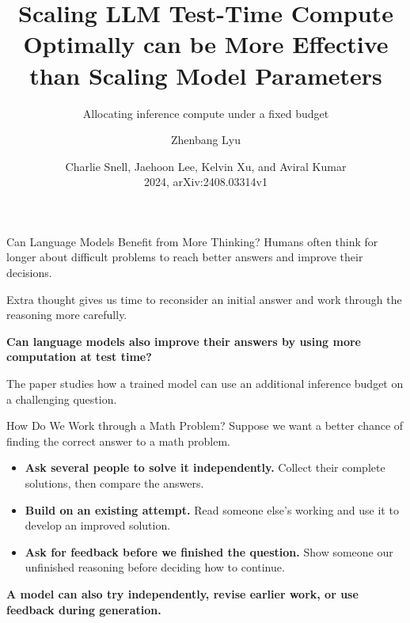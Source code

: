 \documentclass[aspectratio=1610,xcolor=dvipsnames,t]{beamer}
\title[Test-Time Compute in LLMs]{Scaling LLM Test-Time Compute Optimally can be More Effective than Scaling Model Parameters}
\subtitle{Allocating inference compute under a fixed budget}
\author[Zhenbang Lyu]{Zhenbang Lyu}
\institute[Uni HD]{Heidelberg University\\Institute of Computer Science}
\date[]{Charlie Snell, Jaehoon Lee, Kelvin Xu, and Aviral Kumar\\2024, arXiv:2408.03314v1}
\newcommand{\keyterm}[1]{\textcolor{unirot}{\textbf{#1}}}
\begin{document}
\begin{frame}[plain]
  \titlepage
\end{frame}

\begin{frame}{Can Language Models Benefit from More Thinking?}
  Humans often think for longer about difficult problems to reach better answers and improve their decisions.
  \par\medskip
  Extra thought gives us time to reconsider an initial answer and work through the reasoning more carefully.
  \par\medskip
  \keyterm{Can language models also improve their answers by using more computation at test time?}
  \par\medskip
  The paper studies how a trained model can use an additional inference budget on a challenging question.
\end{frame}

\begin{frame}{How Do We Work through a Math Problem?}
  Suppose we want a better chance of finding the correct answer to a math problem.
  \par\medskip
  \begin{itemize}
    \item \textbf{Ask several people to solve it independently.} Collect their complete solutions, then compare the answers.
    \par\smallskip
    \item \textbf{Build on an existing attempt.} Read someone else's working and use it to develop an improved solution.
    \par\smallskip
    \item \textbf{Ask for feedback before we finished the question.} Show someone our unfinished reasoning before deciding how to continue.
  \end{itemize}
  \par\medskip
  \keyterm{A model can also try independently, revise earlier work, or use feedback during generation.}
\end{frame}
\end{document}
